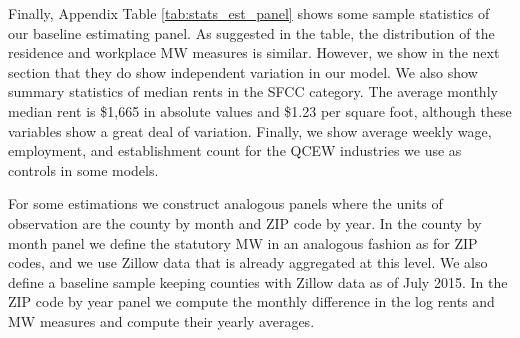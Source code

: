 Finally, Appendix Table \ref{tab:stats_est_panel} shows some sample statistics 
of our baseline estimating panel.
As suggested in the table, the distribution of the residence and workplace MW 
measures is similar.
However, we show in the next section that they do show independent variation
in our model.
We also show summary statistics of median rents in the SFCC category.
The average monthly median rent is \$1,665 in absolute values and \$1.23 
per square foot, although these variables show a great deal of variation.
Finally, we show average weekly wage, employment, and establishment count 
for the QCEW industries we use as controls in some models.

For some estimations we construct analogous panels where the units of 
observation are the county by month and ZIP code by year.
In the county by month panel we define the statutory MW in an analogous fashion 
as for ZIP codes, and we use Zillow data that is already aggregated at this 
level.
We also define a baseline sample keeping counties with Zillow data as of July
2015.
In the ZIP code by year panel we compute the monthly difference in the log rents 
and MW measures and compute their yearly averages.
